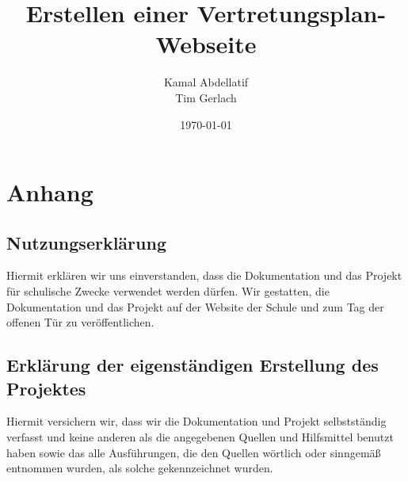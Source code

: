 \documentclass[a4paper,11pt]{scrreprt}
\title{Erstellen einer Vertretungsplan-Webseite}
\author{Kamal Abdellatif \\ Tim Gerlach}
\date{\today}
\begin{document}
\maketitle

\tableofcontents











\chapter*{Anhang}
\section*{Nutzungserklärung}
Hiermit erklären wir uns einverstanden, dass die Dokumentation und das Projekt für
schulische Zwecke verwendet werden dürfen.
Wir gestatten, die Dokumentation und das Projekt auf der Website der Schule und zum
Tag der offenen Tür zu veröffentlichen.

\section*{Erklärung der eigenständigen Erstellung des Projektes}
Hiermit versichern wir, dass wir die Dokumentation und Projekt selbstständig verfasst und
keine anderen als die angegebenen Quellen und Hilfsmittel benutzt haben sowie das alle
Ausführungen, die den Quellen wörtlich oder sinngemäß entnommen wurden, als solche
gekennzeichnet wurden.
\end{document}
